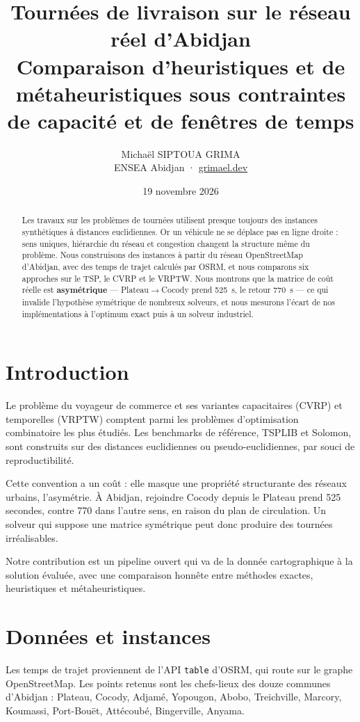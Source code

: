 \documentclass[11pt,a4paper]{article}
\title{\vspace{-1.6cm}\textbf{Tournées de livraison sur le réseau réel d'Abidjan}\\[0.35em]
\large Comparaison d'heuristiques et de métaheuristiques sous contraintes de capacité et de fenêtres de temps}
\author{Michaël SIPTOUA GRIMA\\\small ENSEA Abidjan · \href{https://grimael.dev}{grimael.dev}}
\date{19 novembre 2026}
\begin{document}
\maketitle

\begin{abstract}
\noindent Les travaux sur les problèmes de tournées utilisent presque toujours des instances synthétiques à distances euclidiennes. Or un véhicule ne se déplace pas en ligne droite : sens uniques, hiérarchie du réseau et congestion changent la structure même du problème. Nous construisons des instances à partir du réseau OpenStreetMap d'Abidjan, avec des temps de trajet calculés par OSRM, et nous comparons six approches sur le TSP, le CVRP et le VRPTW. Nous montrons que la matrice de coût réelle est \textbf{asymétrique} — Plateau$\rightarrow$Cocody prend 525~s, le retour 770~s — ce qui invalide l'hypothèse symétrique de nombreux solveurs, et nous mesurons l'écart de nos implémentations à l'optimum exact puis à un solveur industriel.
\end{abstract}

\section{Introduction}

Le problème du voyageur de commerce et ses variantes capacitaires (CVRP) et temporelles (VRPTW) comptent parmi les problèmes d'optimisation combinatoire les plus étudiés. Les benchmarks de référence, TSPLIB et Solomon, sont construits sur des distances euclidiennes ou pseudo-euclidiennes, par souci de reproductibilité.

Cette convention a un coût : elle masque une propriété structurante des réseaux urbains, l'asymétrie. À Abidjan, rejoindre Cocody depuis le Plateau prend 525 secondes, contre 770 dans l'autre sens, en raison du plan de circulation. Un solveur qui suppose une matrice symétrique peut donc produire des tournées irréalisables.

Notre contribution est un pipeline ouvert qui va de la donnée cartographique à la solution évaluée, avec une comparaison honnête entre méthodes exactes, heuristiques et métaheuristiques.

\section{Données et instances}

Les temps de trajet proviennent de l'API \texttt{table} d'OSRM, qui route sur le graphe OpenStreetMap. Les points retenus sont les chefs-lieux des douze communes d'Abidjan : Plateau, Cocody, Adjamé, Yopougon, Abobo, Treichville, Marcory, Koumassi, Port-Bouët, Attécoubé, Bingerville, Anyama.
\end{document}
